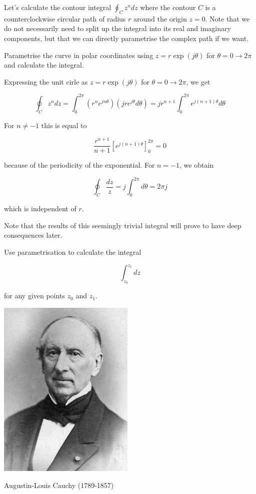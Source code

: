 Let's calculate the contour integral $\oint_{C}z^ndz$ where the contour ${C}$ is a counterclockwise circular path of radius $r$ around the origin $z=0$. Note that we do not necessarily need to split up the integral into its real and imaginary components, but that we can directly parametrise the complex path if we want.

\begin{cue}
Parametrise the curve in polar coordinates using $z=r\exp(j\theta)$ for $\theta=0\to 2 \pi$ and calculate the integral. 
\end{cue}

Expressing the unit cirle as $z=r\exp(j\theta)$ for $\theta=0\to 2 \pi$, we get

$$\oint_{C} z^n dz = \int_0^{2\pi} \left(r^n e^{jn\theta}\right) \left(jr e^{j \theta}d \theta\right)=j r^{n+1} \int_0^{2\pi} e^{j(n+1)\theta} d \theta $$

For $n \neq -1$ this is equal to

$$ \frac{r^{n+1}}{n+1}\left[e^{j(n+1)\theta}\right]_0^{2\pi}=0 $$

because of the periodicity of the exponential. For $n=-1$, we obtain 

$$ \oint_{C} \frac{dz}{z} = j \int_0^{2\pi} d \theta = 2 \pi j $$

which is independent of $r$.

Note that the results of this seemingly trivial integral will prove to have deep consequences later.

\begin{exer}
Use parametrisation to calculate the integral

$$\int_{z_0}^{z_1} dz$$

for any given points $z_0$ and $z_1$.
\end{exer}


\pagebreak



\begin{marginfigure}[+0.3cm]
  \includegraphics{complex/figures/cauchy}
  \caption{Augustin-Louis Cauchy (1789-1857)}
\end{marginfigure}

